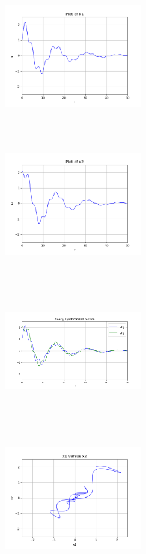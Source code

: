 \documentclass{article}
\begin{document}
\begin{center}
  \includegraphics[width=6cm, height=6cm]{ej2_43.png}
\end{center}

\begin{center}
  \includegraphics[width=6cm, height=6cm]{ej2_44.png}
\end{center}

\begin{center}
  \includegraphics[width=6cm, height=6cm]{ej2_45.png}
\end{center}

\begin{center}
  \includegraphics[width=6cm, height=6cm]{ej2_46.png}
\end{center}
\end{document}
